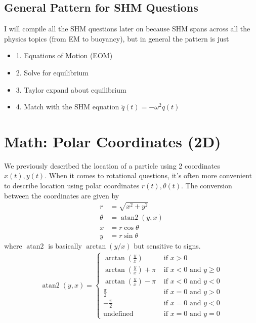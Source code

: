\documentclass{article}
\begin{document}
\subsection{General Pattern for SHM Questions}
I will compile all the SHM questions later on because SHM spans across all the physics topics (from EM to buoyancy), but in general the pattern is just 
\begin{itemize}
    \item[] 1. Equations of Motion (EOM)
    \item[] 2. Solve for equilibrium
    \item[] 3. Taylor expand about equilibrium
    \item[] 4. Match with the SHM equation $\ddot q(t) = -\omega^2 q(t)$
\end{itemize}
\section{Math: Polar Coordinates (2D)}
We previously described the location of a particle using 2 coordinates $x(t),y(t)$. When it comes to rotational questions, it's often more convenient to describe location using polar coordinates $r(t), \theta(t)$. The conversion between the coordinates are given by
\begin{align}
    r &= \sqrt{x^2 + y^2} \\
    \theta &= \operatorname{atan2} (y,x) \\ 
    x &= r \cos \theta \\
    y &= r \sin \theta
\end{align}
where $\operatorname{atan2}$ is basically $\arctan (y/x)$ but sensitive to signs.
\begin{align}
    \operatorname{atan2} (y, x)= \begin{cases}\arctan \left(\frac{y}{x}\right) & \text { if } x>0 \\ \arctan \left(\frac{y}{x}\right)+\pi & \text { if } x<0 \text { and } y \geq 0 \\ \arctan \left(\frac{y}{x}\right)-\pi & \text { if } x<0 \text { and } y<0 \\ \frac{\pi}{2} & \text { if } x=0 \text { and } y>0 \\ -\frac{\pi}{2} & \text { if } x=0 \text { and } y<0 \\ \text {undefined } & \text { if } x=0 \text { and } y=0 \end{cases} \label{eq:atan2}
\end{align}
\end{document}
